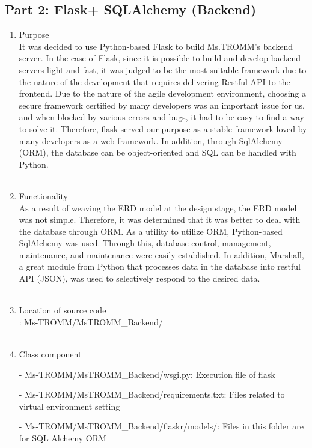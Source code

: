 \documentclass[conference]{IEEEtran}
\begin{document}
\subsection{Part 2: Flask+ SQLAlchemy (Backend)}
\begin{enumerate}
    \item Purpose\\
    It was decided to use Python-based Flask to build Ms.TROMM's backend server. In the case of Flask, since it is possible to build and develop backend servers light and fast, it was judged to be the most suitable framework due to the nature of the development that requires delivering Restful API to the frontend. Due to the nature of the agile development environment, choosing a secure framework certified by many developers was an important issue for us, and when blocked by various errors and bugs, it had to be easy to find a way to solve it. Therefore, flask served our purpose as a stable framework loved by many developers as a web framework. In addition, through SqlAlchemy (ORM), the database can be object-oriented and SQL can be handled with Python.\\ \\
    \item Functionality\\
    As a result of weaving the ERD model at the design stage, the ERD model was not simple. Therefore, it was determined that it was better to deal with the database through ORM. As a utility to utilize ORM, Python-based SqlAlchemy was used. Through this, database control, management, maintenance, and maintenance were easily established. In addition, Marshall, a great module from Python that processes data in the database into restful API (JSON), was used to selectively respond to the desired data.\\ \\
    \item Location of source code\\: Ms-TROMM/MsTROMM\_Backend/ \\ \\
    \item Class component \\
        \item[-] Ms-TROMM/MsTROMM\_Backend/wsgi.py: Execution file of flask \\
        \item[-] Ms-TROMM/MsTROMM\_Backend/requirements.txt: Files related to virtual environment setting \\
        \item[-] Ms-TROMM/MsTROMM\_Backend/flaskr/models/: Files in this folder are for SQL Alchemy ORM \\ \\

\end{enumerate}
\end{document}
